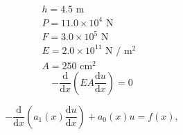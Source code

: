 \documentclass[a4paper]{article}
\begin{document}
\[
  \begin{array}{l}
  h = 4.5\text{ m }\\
  P = 11.0\times 10^{4}\text{ N }\\
  F = 3.0\times 10^{5}\text{ N }\\
  E = 2.0\times 10^{11}\text{ N / m$^{2}$ }\\
  A = 250\text{ cm$^{2}$ }
  \end{array}
\]
\[
  -\dfrac{\mathrm{d}}{\mathrm{d} x}\left(EA\dfrac{\mathrm{d} u}{\mathrm{d}
    x}\right) = 0
  \]

\[
  -\dfrac{\mathrm{d}}{\mathrm{d} x}\left(a_{1}(x)\dfrac{\mathrm{d} u}{\mathrm{d}
  x}\right) + a_{0}(x)u = f(x),

  \]
\end{document}
